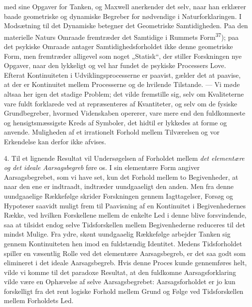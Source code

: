 \documentclass[12pt,a4paper,openany]{book}
\newcommand{\opage}[1]{\marginnote{\footnotesize\textit{[#1]}}}
\begin{document}
med sine Opgaver for Tanken, og Maxwell anerkender det selv, naar han erklærer
baade geometriske og dynamiske Begreber for nødvendige i Naturforklaringen. I
Modsætning til det Dynamiske betegner det Geometriske Samtidigheden. Paa den
materielle Naturs Omraade fremtræder det Samtidige i Rummets
Form\textsuperscript{37}); paa det psykiske Omraade antager
Samtidighedsforholdet ikke denne geometriske Form, men fremtræder alligevel som
noget „Statisk“, der stiller Forskningen nye Opgaver, naar den lykkeligt og vel
har fundet de psykiske Processers Love. Efterat Kontinuiteten i
Udviklingsprocesserne er paavist, gælder det at paavise, at der er Kontinuitet
mellem Processerne og de hvilende Tilstande. --- Vi møde altsaa her igen det
stadige Problem; det vilde fremstille sig, selv om Kvaliteterne vare fuldt
forklarede ved at repræsenteres af Kvantiteter, og selv om de fysiske
Grundbegreber, hvormed Videnskaben opererer, vare mere end den fuldkomneste og
hensigtsmæssigste Kreds af Symboler, det hidtil er lykkedes at forme og anvende.
\opage{43}Muligheden af et irrationelt Forhold mellem Tilværelsen og vor
Erkendelse kan derfor ikke afvises.

4. Til et lignende Resultat vil Undersøgelsen af Forholdet mellem \textit{det
elementære og det ideale Aarsagsbegreb} føre os. I sin elementære Form angiver
Aarsagsbegrebet, som vi have set, kun det Forhold mellem to Begivenheder, at
naar den ene er indtraadt, indtræder uundgaaeligt den anden. Men fra denne
uundgaaelige Rækkefølge skrider Forskningen gennem Iagttagelser, Forsøg og
Hypoteser saavidt muligt frem til Paavisning af en Kontinuitet i
Begivenhedernes Række, ved hvilken Forskellene mellem de enkelte Led i denne
blive forsvindende, saa at tilsidst endog selve Tidsforskellen mellem
Begivenhederne reduceres til det mindst Mulige. Fra ydre, skønt uundgaaelig
Rækkefølge arbejder Tanken sig gennem Kontinuiteten hen imod en fuldstændig
Identitet. Medens Tidsforholdet spiller en væsentlig Rolle ved det elementære
Aarsagsbegreb, er det saa godt som elimineret i det ideale Aarsagsbegreb. Hvis
denne Proces kunde gennemføres helt, vilde vi komme til det paradoxe Resultat,
at den fuldkomne Aarsagsforklaring vilde være en Ophævelse af selve
Aarsagsbegrebet: Aarsagsforholdet er jo kun forskelligt fra det rent logiske
Forhold mellem Grund og Følge ved Tidsforskellen mellem Forholdets Led.
\end{document}
